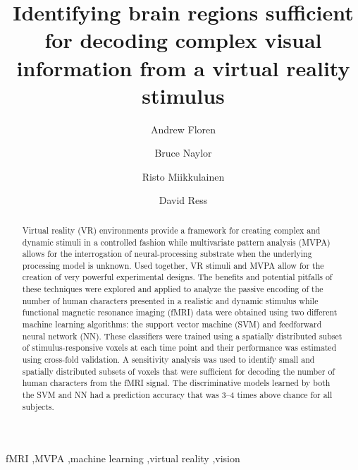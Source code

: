 \documentclass[review,1p,authoryear]{elsarticle}
\begin{document}
\begin{frontmatter}

\title{Identifying brain regions sufficient for decoding complex visual information from a virtual reality stimulus}

\author[ECE,NS]{Andrew Floren}

\author[NS]{Bruce Naylor}

\author[CS]{Risto Miikkulainen}

\author[BCM]{David Ress}

\address[ECE]{Department of Electrical and Computer Engineering}
\address[NS]{Department of Neuroscience}
\address[CS]{Computer Science Department \\ The University of Texas at Austin, Austin, TX 78712 USA}
\address[BCM]{Department of Neuroscience \\ Baylor College of Medicine, Houston, TX 77030 USA}


\begin{abstract}
Virtual reality (VR) environments provide a framework for creating complex and dynamic stimuli in a controlled fashion while multivariate pattern analysis (MVPA) allows for the interrogation of neural-processing substrate when the underlying processing model is unknown. 
Used together, VR stimuli and MVPA allow for the creation of very powerful experimental designs. 
The benefits and potential pitfalls of these techniques were explored and applied to analyze the passive encoding of the number of human characters presented in a realistic and dynamic stimulus while functional magnetic resonance imaging (fMRI) data were obtained using two different machine learning algorithms: the support vector machine (SVM) and feedforward neural network (NN). 
These classifiers were trained using a spatially distributed subset of stimulus-responsive voxels at each time point and their performance was estimated using cross-fold validation.
A sensitivity analysis was used to identify small and spatially distributed subsets of voxels that were sufficient for decoding the number of human characters from the fMRI signal.
The discriminative models learned by both the SVM and NN had a prediction accuracy that was 3--4 times above chance for all subjects.
\end{abstract}

\begin{keyword}
fMRI \sep MVPA \sep machine learning \sep virtual reality \sep vision
\end{keyword}

\end{frontmatter}
\end{document}
